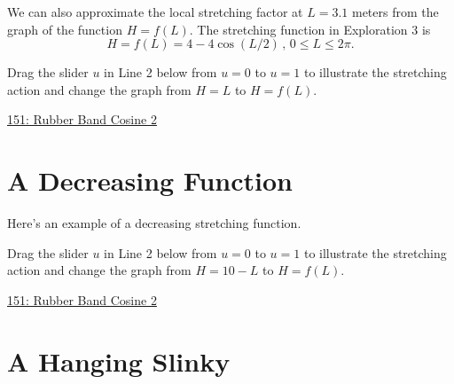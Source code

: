 \documentclass{ximera}
\begin{document}
We can also approximate the local stretching factor at $L=3.1$ meters from the graph of the function $H=f(L)$. The stretching function in Exploration 3 is
\[
      H = f(L) = 4 - 4\cos (L/2) \, , \, 0\leq L \leq 2\pi.
\]

\begin{exploration} \label{ExLtegfgfgyhhhf}
Drag the slider $u$ in Line 2 below from $u=0$ to $u=1$ to illustrate the stretching action and change the graph from $H=L$ to $H=f(L)$.
\begin{onlineOnly}
    \begin{center}
\end{center}
\end{onlineOnly}

\href{https://www.desmos.com/calculator/dpxbfdwiag}{151: Rubber Band Cosine 2}

\end{exploration}

\section{A Decreasing Function}

\begin{exploration} \label{Ex:LKDMNDFDSAdsa}
Here's an example of a decreasing stretching function.

Drag the slider $u$ in Line 2 below from $u=0$ to $u=1$ to illustrate the stretching action and change the graph from $H=10-L$ to $H=f(L)$.
\begin{onlineOnly}
    \begin{center}
\end{center}
\end{onlineOnly}

\href{https://www.desmos.com/calculator/04kfcfukfy}{151: Rubber Band Cosine 2}


\end{exploration}

\section{A Hanging Slinky}

\begin{onlineOnly}
    \begin{center}
\end{center}
\end{onlineOnly}
\end{document}

